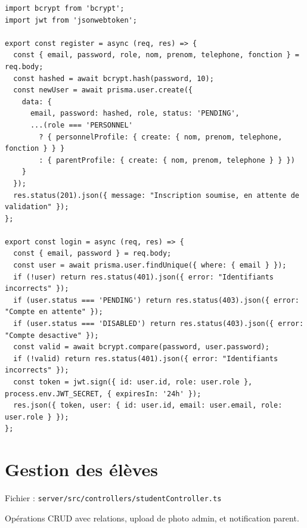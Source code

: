 \documentclass[12pt,a4paper]{article}
\begin{document}
\begin{lstlisting}[style=code]
import bcrypt from 'bcrypt';
import jwt from 'jsonwebtoken';

export const register = async (req, res) => {
  const { email, password, role, nom, prenom, telephone, fonction } = req.body;
  const hashed = await bcrypt.hash(password, 10);
  const newUser = await prisma.user.create({
    data: {
      email, password: hashed, role, status: 'PENDING',
      ...(role === 'PERSONNEL'
        ? { personnelProfile: { create: { nom, prenom, telephone, fonction } } }
        : { parentProfile: { create: { nom, prenom, telephone } } })
    }
  });
  res.status(201).json({ message: "Inscription soumise, en attente de validation" });
};

export const login = async (req, res) => {
  const { email, password } = req.body;
  const user = await prisma.user.findUnique({ where: { email } });
  if (!user) return res.status(401).json({ error: "Identifiants incorrects" });
  if (user.status === 'PENDING') return res.status(403).json({ error: "Compte en attente" });
  if (user.status === 'DISABLED') return res.status(403).json({ error: "Compte desactive" });
  const valid = await bcrypt.compare(password, user.password);
  if (!valid) return res.status(401).json({ error: "Identifiants incorrects" });
  const token = jwt.sign({ id: user.id, role: user.role }, process.env.JWT_SECRET, { expiresIn: '24h' });
  res.json({ token, user: { id: user.id, email: user.email, role: user.role } });
};
\end{lstlisting}

\newpage

\section{Gestion des élèves}

Fichier : \texttt{server/src/controllers/studentController.ts}

Opérations CRUD avec relations, upload de photo admin, et notification parent.
\end{document}
